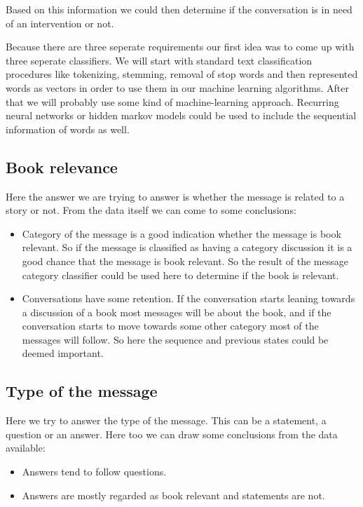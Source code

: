 \documentclass[11pt,a4paper]{article}
\begin{document}
Based on this information we could then determine if the conversation is in need of an intervention or not.

Because there are three seperate requirements our first idea was to come up with three seperate classifiers.
We will start with standard text classification procedures like tokenizing, stemming, removal of stop words and then represented words as vectors in order to use them in our machine learning algorithms.
After that we will probably use some kind of machine-learning approach. 
Recurring neural networks or hidden markov models could be used to include the sequential information of words as well.

\subsection{Book relevance}
Here the answer we are trying to answer is whether the message is related to a story or not.
From the data itself we can come to some conclusions:

\begin{itemize}
\item{Category of the message is a good indication whether the message is book relevant. 
So if the message is classified as having a category discussion it is a good chance that the message is book relevant.
So the result of the message category classifier could be used here to determine if the book is relevant.}
\item{Conversations have some retention.
If the conversation starts leaning towards a discussion of a book most messages will be about the book, and if the conversation starts to move towards some other category most of the messages will follow.
 So here the sequence and previous states could be deemed important.}
\end{itemize}

\subsection{Type of the message}
Here we try to answer the type of the message. 
This can be a statement, a question or an answer.
Here too we can draw some conclusions from the data available:

\begin{itemize}
\item{Answers tend to follow questions.}
\item{Answers are mostly regarded as book relevant and statements are not.}
\end{itemize}
\end{document}
